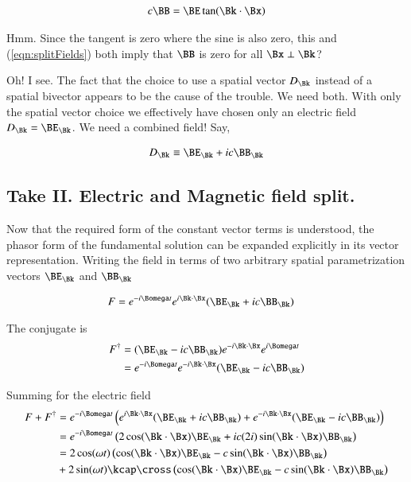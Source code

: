 \begin{align}\label{eqn:questionable}
c \BB = \BE \tan(\Bk \cdot \Bx)
\end{align}

Hmm.  Since the tangent is zero where the sine is also zero, this and (\ref{eqn:splitFields}) both imply that $\BB$ is zero for all $\Bx \perp \Bk$?

Oh!  I see.  The fact that the choice to use a spatial vector $D_\Bk$ instead of a spatial bivector appears to be the cause of the trouble.  We need both.  With only the spatial vector choice we effectively have chosen only an electric field $D_\Bk = \BE_\Bk$.  We need a combined field!  Say,

\begin{align}
D_\Bk \equiv \BE_\Bk + i c \BB_\Bk
\end{align}

\subsection{Take II.  Electric and Magnetic field split.}

Now that the required form of the constant vector terms is understood, the phasor form of the fundamental solution can be expanded explicitly in its vector representation.  Writing the field in terms of two arbitrary spatial parametrization vectors $\BE_\Bk$ and $\BB_\Bk$

\begin{align}\label{eqn:phasor}
F &= e^{-i\Bomega t} e^{i \Bk \cdot \Bx} (\BE_\Bk + i c \BB_\Bk) 
\end{align}

The conjugate is
\begin{align*}
F^\dagger 
&= (\BE_\Bk - i c \BB_\Bk) e^{-i \Bk \cdot \Bx} e^{i\Bomega t} \\
&= 
e^{-i\Bomega t}
e^{-i \Bk \cdot \Bx} 
(\BE_\Bk - i c \BB_\Bk) 
\end{align*}

Summing for the electric field
\begin{align*}
F + F^\dagger
&=
e^{-i\Bomega t} \left(
 e^{i \Bk \cdot \Bx} (\BE_\Bk + i c \BB_\Bk) 
+e^{-i \Bk \cdot \Bx} (\BE_\Bk - i c \BB_\Bk)  
\right) \\
&=
e^{-i\Bomega t} \left(
 2 \cos(\Bk \cdot \Bx) \BE_\Bk 
+ i c (2 i) \sin(\Bk \cdot \Bx) \BB_\Bk 
\right) \\
&=
2 \cos(\omega t) \left(
 \cos(\Bk \cdot \Bx) \BE_\Bk 
- c \sin(\Bk \cdot \Bx) \BB_\Bk 
\right) \\
&+ 2 
\sin(\omega t)
\kcap \cross 
\left(
 \cos(\Bk \cdot \Bx) \BE_\Bk 
- c \sin(\Bk \cdot \Bx) \BB_\Bk 
\right) \\
\end{align*}

